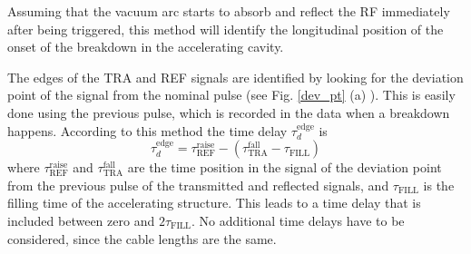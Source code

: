 Assuming that the vacuum arc starts to absorb and reflect the RF immediately after being triggered, this method will identify the longitudinal position of the onset of the breakdown in the accelerating cavity.

The edges of the TRA and REF signals are identified by looking for the deviation point of the signal from the nominal pulse (see Fig. \ref{dev_pt} (a) ). This is easily done using the previous pulse, which is recorded in the data when a breakdown happens.  According to this method the time delay $\tau_d^{\text{edge}}$ is
\begin{equation}
\tau_d^{\text{edge}} = \tau_\text{REF} ^\text{raise} - (\tau_\text{TRA} ^\text{fall} - \tau_{\text{FILL}})
\end{equation}
where $\tau^\text{raise} _{\text{REF}} $ and $\tau^\text{fall} _{\text{TRA}}$ are the time position in the signal of the deviation point from the previous pulse of the transmitted and reflected signals, and $\tau_{\text{FILL}}$ is the filling time of the accelerating structure. This leads to a time delay that is included between zero and $2 \tau_{\text{FILL}}$. No additional time delays have to be considered, since the cable lengths are the same. 


